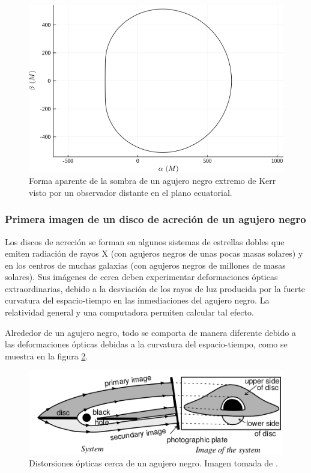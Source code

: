 \documentclass[11pt]{article}
\begin{document}
\begin{figure}[H]
\centering
\includegraphics[width=0.5\linewidth]{Images/kerr_shadow.png}
\caption{Forma aparente de la sombra de un agujero negro extremo de Kerr visto por un observador distante en el plano ecuatorial.}
\label{fig:sombra_kerr}
\end{figure}

\subsubsection{Primera imagen de un disco de acreción de un agujero negro}

Los discos de acreción se forman en algunos sistemas de estrellas dobles que emiten radiación de rayos X (con agujeros negros de unas pocas masas solares) y en los centros de muchas galaxias (con agujeros negros de millones de masas solares). Sus imágenes de cerca deben experimentar deformaciones ópticas extraordinarias, debido a la desviación de los rayos de luz producida por la fuerte curvatura del espacio-tiempo en las inmediaciones del agujero negro. La relatividad general y una computadora permiten calcular tal efecto. \medskip

Alrededor de un agujero negro, todo se comporta de manera diferente debido a las deformaciones ópticas debidas a la curvatura del espacio-tiempo, como se muestra en la figura \ref{fig:acrecion_schwarzschild}.

\begin{figure}[H]
\centering
\includegraphics[width=0.5\linewidth]{Images/black_hole_distortions.png}
\caption{Distorsiones ópticas cerca de un agujero negro. Imagen tomada de \cite{Luminet_1992}.}
\label{fig:acrecion_schwarzschild}
\end{figure}

\newpage
\end{document}
